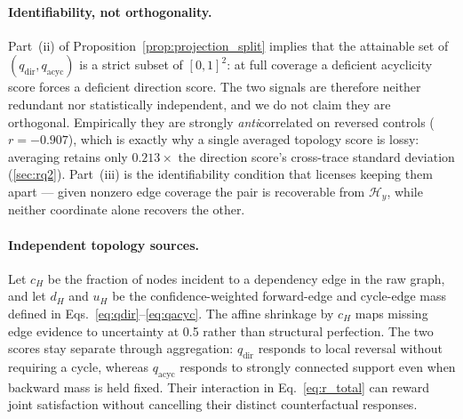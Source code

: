 \paragraph{Identifiability, not orthogonality.}
Part~(ii) of Proposition~\ref{prop:projection_split} implies that the attainable set of $(q_{\mathrm{dir}},q_{\mathrm{acyc}})$ is a strict subset of $[0,1]^2$: at full coverage a deficient acyclicity score forces a deficient direction score. The two signals are therefore neither redundant nor statistically independent, and we do not claim they are orthogonal. Empirically they are strongly \emph{anti}correlated on reversed controls ($r=-0.907$), which is exactly why a single averaged topology score is lossy: averaging retains only $0.213\times$ the direction score's cross-trace standard deviation (\cref{sec:rq2}). Part~(iii) is the identifiability condition that licenses keeping them apart --- given nonzero edge coverage the pair is recoverable from $\mathcal{H}_y$, while neither coordinate alone recovers the other.

\paragraph{Independent topology sources.}
Let $c_H$ be the fraction of nodes incident to a dependency edge in the raw graph, and let $d_H$ and $u_H$ be the confidence-weighted forward-edge and cycle-edge mass defined in Eqs.~\eqref{eq:qdir}--\eqref{eq:qacyc}. The affine shrinkage by $c_H$ maps missing edge evidence to uncertainty at 0.5 rather than structural perfection. The two scores stay separate through aggregation: $q_{\mathrm{dir}}$ responds to local reversal without requiring a cycle, whereas $q_{\mathrm{acyc}}$ responds to strongly connected support even when backward mass is held fixed. Their interaction in Eq.~\ref{eq:r_total} can reward joint satisfaction without cancelling their distinct counterfactual responses.

